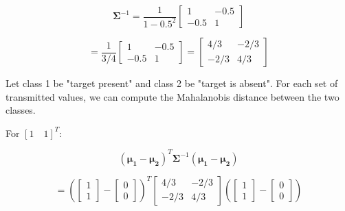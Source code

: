 \documentclass[fleqn]{article}
\begin{document}
\begin{enumerate}
\begin{enumerate}
			\begin{equation*}
				\mathbf{\Sigma}^{-1} = \frac{1}{1 - 0.5^2}\begin{bmatrix} 1 & -0.5 \\ -0.5 & 1 \end{bmatrix}
			\end{equation*}
			
			\begin{equation*}
				 = \frac{1}{3/4}\begin{bmatrix} 1 & -0.5 \\ -0.5 & 1 \end{bmatrix} = \begin{bmatrix} 4/3 & -2/3 \\ -2/3 & 4/3 \end{bmatrix}
			\end{equation*}
			
			Let class 1 be "target present" and class 2 be "target is absent". For each set of transmitted values, we can compute the Mahalanobis distance between the two classes.
			
			For $[1 \quad 1]^T$:
			
			\begin{equation*}
				(\mathbf{\mu_1} - \mathbf{\mu_2})^T\mathbf{\Sigma}^{-1}(\mathbf{\mu_1} - \mathbf{\mu_2})
			\end{equation*}
			
			 \begin{equation*}
				= \left(\begin{bmatrix} 1 \\ 1 \end{bmatrix} - \begin{bmatrix} 0 \\ 0 \end{bmatrix}\right)^T\begin{bmatrix} 4/3 & -2/3 \\ -2/3 & 4/3 \end{bmatrix}\left(\begin{bmatrix} 1 \\ 1 \end{bmatrix} - \begin{bmatrix} 0 \\ 0 \end{bmatrix}\right)
			\end{equation*}
			

\end{enumerate}
\end{enumerate}
\end{document}
